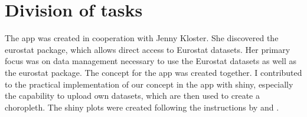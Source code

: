 \documentclass[a4paper,10pt, onecolumn]{article}\usepackage[]{graphicx}\usepackage[]{color}
\begin{document}

\section{Division of tasks}

The app was created in cooperation with Jenny Kloster. She discovered the eurostat package, which allows direct access to Eurostat datasets. Her primary focus was on data management necessary to use the Eurostat datasets as well as the eurostat package. The concept for the app was created together. I contributed to the practical implementation of our concept in the app with shiny, especially the capability to upload own datasets, which are then used to create a choropleth. The shiny plots were created following the instructions by  and .




\end{document}
